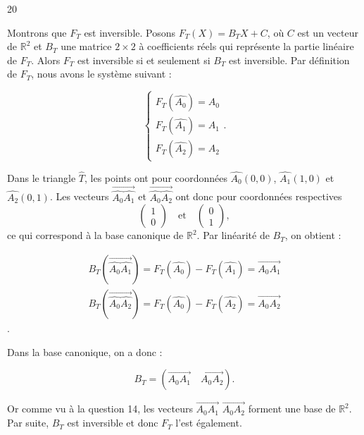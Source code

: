 \begin{reponse}{20}

Montrons que $F_T$ est inversible. Posons $F_T(X)=B_TX+C$, où $C$ est un vecteur de $\mathbb{R}^2$ et $B_T$ une matrice $2 \times 2$ à coefficients réels qui représente la partie linéaire de $F_T$. Alors $F_T$ est inversible si et seulement si $B_T$ est inversible. Par définition de $F_T$, nous avons le système suivant : 

\[
    \begin{cases}
        F_T(\hat{A_0})=A_0 \\ F_T(\hat{A_1})=A_1 \\ F_T(\hat{A_2})=A_2
    \end{cases}. 
\]

Dans le triangle $\hat{T}$, les points ont pour coordonnées $\hat{A_0}(0,0)$, $\hat{A_1}(1,0)$ et $\hat{A_2}(0,1)$. Les vecteurs $\overset{\rightarrow}{\hat{A_0}\hat{A_1}}$ et $\overset{\rightarrow}{\hat{A_0}\hat{A_2}}$ ont donc pour coordonnées respectives $$\begin{pmatrix}
    1 \\ 0
\end{pmatrix} \quad \text{et} \quad \begin{pmatrix}
    0 \\ 1
\end{pmatrix},$$ ce qui correspond à la base canonique de $\mathbb{R}^2$. Par linéarité de $B_T$, on obtient :

\begin{align*}
    B_T(\overset{\rightarrow}{\hat{A_0}\hat{A_1}})=F_T(\hat{A_0})-F_T(\hat{A_1}) = \overset{\rightarrow}{A_0A_1} \\
    B_T(\overset{\rightarrow}{\hat{A_0}\hat{A_2}})=F_T(\hat{A_0})-F_T(\hat{A_2}) = \overset{\rightarrow}{A_0A_2}
\end{align*}.

Dans la base canonique, on a donc :

\[
    B_T = \left( \overset{\rightarrow}{A_0A_1} \quad \overset{\rightarrow}{A_0A_2} \right).
\]

Or comme vu à la question 14, les vecteurs $\overset{\rightarrow}{A_0A_1}$ $\overset{\rightarrow}{A_0A_2}$ forment une base de $\mathbb{R}^2$. Par suite, $B_T$ est inversible et donc $F_T$ l'est également.
\end{reponse}


